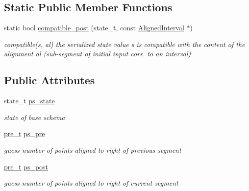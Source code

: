 \subsection*{Static Public Member Functions}
\begin{DoxyCompactItemize}
\item 
static bool \mbox{\hyperlink{group__schemata_gaa509247277fd021460056bfe6484a5b4}{compatible\+\_\+post}} (state\+\_\+t, const \mbox{\hyperlink{classAlignedInterval}{Aligned\+Interval}} $\ast$)
\begin{DoxyCompactList}\small\item\em compatible(s, al) the serialized state value s is compatible with the content of the alignment al (sub-\/segment of initial input corr. to an interval) \end{DoxyCompactList}\end{DoxyCompactItemize}
\subsection*{Public Attributes}
\begin{DoxyCompactItemize}
\item 
\mbox{\label{classPreState_a1d941524de94901c642c36d204a13bd9}} 
state\+\_\+t \mbox{\hyperlink{classPreState_a1d941524de94901c642c36d204a13bd9}{ps\+\_\+state}}
\begin{DoxyCompactList}\small\item\em state of base schema \end{DoxyCompactList}\item 
\mbox{\label{classPreState_a5fc7201e1b332037f39469341dacca62}} 
\mbox{\hyperlink{group__general_ga092fe8b972dfa977c2a0886720a7731e}{pre\+\_\+t}} \mbox{\hyperlink{classPreState_a5fc7201e1b332037f39469341dacca62}{ps\+\_\+pre}}
\begin{DoxyCompactList}\small\item\em guess number of points aligned to right of previous segment \end{DoxyCompactList}\item 
\mbox{\label{classPreState_a20af8f9950f98cdc6991292004a1e881}} 
\mbox{\hyperlink{group__general_ga092fe8b972dfa977c2a0886720a7731e}{pre\+\_\+t}} \mbox{\hyperlink{classPreState_a20af8f9950f98cdc6991292004a1e881}{ps\+\_\+post}}
\begin{DoxyCompactList}\small\item\em guess number of points aligned to right of current segment \end{DoxyCompactList}\end{DoxyCompactItemize}
